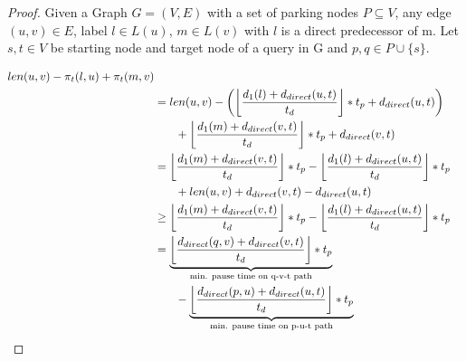 \begin{proof}
	Given a Graph $G=(V,E)$ with a set of parking nodes $P \subseteq V$, any edge $(u,v) \in E$, label $l \in L(u)$, $m \in L(v)$ with $l$ is a direct predecessor of m. Let $s,t \in V$ be starting node and target node of a query in G and $p,q \in P \cup \{s\}$.

	\begin{align}
		\begin{split}\label{eq:label_feasibility_proof_1}
			len(u,v) - \pi_t(l,u) + \pi_t  (m,v)                                                                                                                                                                                                       \\
			& =  len(u,v) - \left(\floor*{ \frac{d_1(l) + d_{direct}(u,t)}{t_d} } * t_p + d_{direct}(u,t)\right)                                                                                                                                      \\
			& \phantom{{}=1} +  \floor*{ \frac{d_1(m) + d_{direct}(v,t)}{t_d} } * t_p + d_{direct}(v,t)                                                                                                                                               \\
			& =  \floor*{ \frac{d_1(m) + d_{direct}(v,t)}{t_d} } * t_p - \floor*{ \frac{d_1(l) + d_{direct}(u,t)}{t_d} } * t_p                                                                                                                        \\
			& \phantom{{}=1} + len(u,v) + d_{direct}(v,t) - d_{direct}(u,t)                                                                                                                                                                           \\
			& \ge   \floor*{ \frac{d_1(m) + d_{direct}(v,t)}{t_d} } * t_p - \floor*{ \frac{d_1(l) + d_{direct}(u,t)}{t_d} } * t_p                                                                                                                       \\
			& =  \underbrace{ \floor*{ \frac{d_{direct}(q,v) + d_{direct}(v,t)}{t_d} } * t_p}_\text{min. pause time on q-v-t path}\\
			& \phantom{{}=1} - \underbrace{\floor*{ \frac{d_{direct}(p,u) + d_{direct}(u,t)}{t_d} } * t_p}_\text{min. pause time on p-u-t path}
		\end{split}
	\end{align}


\end{proof}
